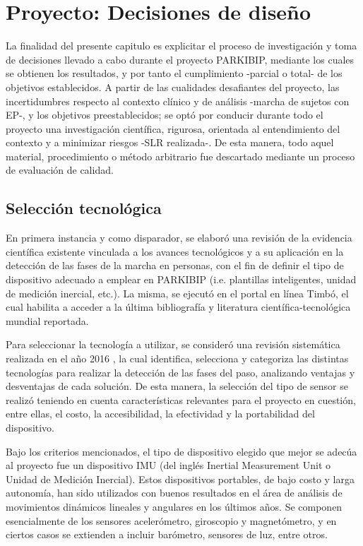 \chapter{Proyecto: Decisiones de diseño}\label{chap:project} %

La finalidad del presente capitulo es explicitar el proceso de investigación y toma de decisiones llevado a cabo durante el proyecto PARKIBIP, mediante los cuales se obtienen los resultados, y por tanto el cumplimiento -parcial o total- de los objetivos establecidos. A partir de las cualidades desafiantes del proyecto, las incertidumbres respecto al contexto clínico y de análisis -marcha de sujetos con EP-, y los objetivos preestablecidos; se optó por conducir durante todo el proyecto una investigación científica, rigurosa, orientada al entendimiento del contexto y a minimizar riesgos -SLR realizada-. De esta manera, todo aquel material, procedimiento o método arbitrario fue descartado mediante un proceso de evaluación de calidad.

\section{Selección tecnológica}\label{seleccion_tecnologica}

En primera instancia y como disparador, se elaboró una revisión de la evidencia científica existente vinculada a los avances tecnológicos y a su aplicación en la detección de las fases de la marcha en personas, con el fin de definir el tipo de dispositivo adecuado a emplear en PARKIBIP (i.e. plantillas inteligentes, unidad de medición inercial, etc.). La misma, se ejecutó en el portal en línea Timbó, el cual habilita a acceder a la última bibliografía y literatura científica-tecnológica mundial reportada.

Para seleccionar la tecnología a utilizar, se consideró una revisión sistemática realizada en el año 2016 \cite{Taborri2016}, la cual identifica, selecciona y categoriza las distintas tecnologías para realizar la detección de las fases del paso, analizando ventajas y desventajas de cada solución. De esta manera, la selección del tipo de sensor se realizó teniendo en cuenta características relevantes para el proyecto en cuestión, entre ellas, el costo, la accesibilidad, la efectividad y la portabilidad del dispositivo.

Bajo los criterios mencionados, el tipo de dispositivo elegido que mejor se adecúa al proyecto fue un dispositivo IMU (del inglés Inertial Measurement Unit o Unidad de Medición Inercial). Estos dispositivos portables, de bajo costo y larga autonomía, han sido utilizados con buenos resultados en el área de análisis de movimientos dinámicos lineales y angulares en los últimos años. Se componen esencialmente de los sensores acelerómetro, giroscopio y magnetómetro, y en ciertos casos se extienden a incluir barómetro, sensores de luz, entre otros.

